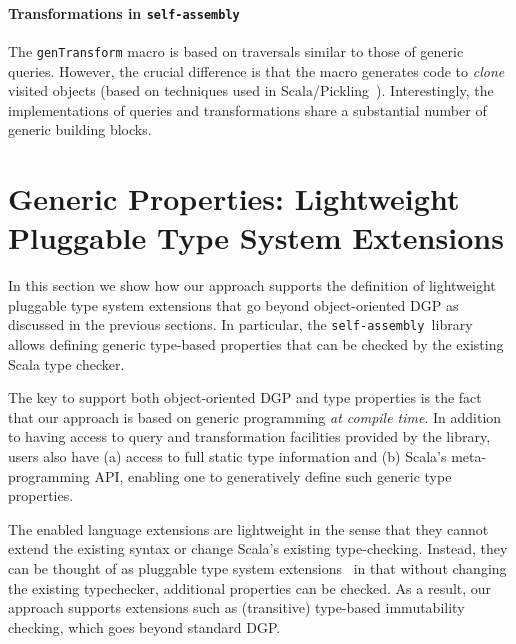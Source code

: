 \documentclass[preprint,nocopyrightspace]{sigplanconf}
\newcommand{\selfassembly}{\texttt{self-assembly~}}
\begin{document}
\paragraph{Transformations in \selfassembly}
The \verb|genTransform| macro is based on traversals similar to those of
generic queries. However, the crucial difference is that the macro generates
code to {\em clone} visited objects (based on techniques used in
Scala/Pickling~\cite{Pickling}). Interestingly, the implementations of queries and
transformations share a substantial number of generic building blocks.


\section{Generic Properties: Lightweight Pluggable Type System Extensions}
\label{sec:language-extensions}

In this section we show how our approach supports the definition of
lightweight pluggable type system extensions that go beyond object-oriented DGP as
discussed in the previous sections. In particular, the \selfassembly library
allows defining generic type-based properties that can be checked by the
existing Scala type checker.


The key to support both object-oriented DGP and type properties is the fact
that our approach is based on generic programming {\em at compile time}. In
addition to having access to query and transformation facilities provided by
the library, users also have (a) access to full static type information and
(b) Scala's meta-programming API, enabling one to generatively define such
generic type properties.

The enabled language extensions are lightweight in the sense that they cannot
extend the existing syntax or change Scala's existing type-checking. Instead,
they can be thought of as pluggable type system
extensions~\cite{PluggableTypes} in that without changing the existing
typechecker, additional properties can be checked. As a result, our approach
supports extensions such as (transitive) type-based immutability checking,
which goes beyond standard DGP.
\end{document}
